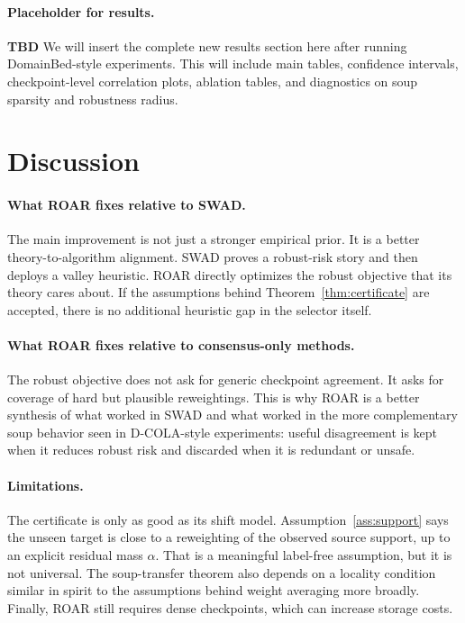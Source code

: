 \documentclass{article}
\newcommand{\TBD}{\textbf{TBD}}
\newcommand{\roar}{\textup{\textsc{ROAR}}}
\newcommand{\swad}{\textup{\textsc{SWAD}}}
\newcommand{\dcola}{\textup{\textsc{D-COLA}}}
\begin{document}
\paragraph{Placeholder for results.}
\TBD{} We will insert the complete new results section here after running DomainBed-style experiments. This will include main tables, confidence intervals, checkpoint-level correlation plots, ablation tables, and diagnostics on soup sparsity and robustness radius.

\section{Discussion}

\paragraph{What \roar{} fixes relative to \swad{}.}
The main improvement is not just a stronger empirical prior. It is a better theory-to-algorithm alignment. \swad{} proves a robust-risk story and then deploys a valley heuristic. \roar{} directly optimizes the robust objective that its theory cares about. If the assumptions behind Theorem~\ref{thm:certificate} are accepted, there is no additional heuristic gap in the selector itself.

\paragraph{What \roar{} fixes relative to consensus-only methods.}
The robust objective does not ask for generic checkpoint agreement. It asks for coverage of hard but plausible reweightings. This is why \roar{} is a better synthesis of what worked in \swad{} and what worked in the more complementary soup behavior seen in \dcola{}-style experiments: useful disagreement is kept when it reduces robust risk and discarded when it is redundant or unsafe.

\paragraph{Limitations.}
The certificate is only as good as its shift model. Assumption~\ref{ass:support} says the unseen target is close to a reweighting of the observed source support, up to an explicit residual mass $\alpha$. That is a meaningful label-free assumption, but it is not universal. The soup-transfer theorem also depends on a locality condition similar in spirit to the assumptions behind weight averaging more broadly. Finally, \roar{} still requires dense checkpoints, which can increase storage costs.
\end{document}
